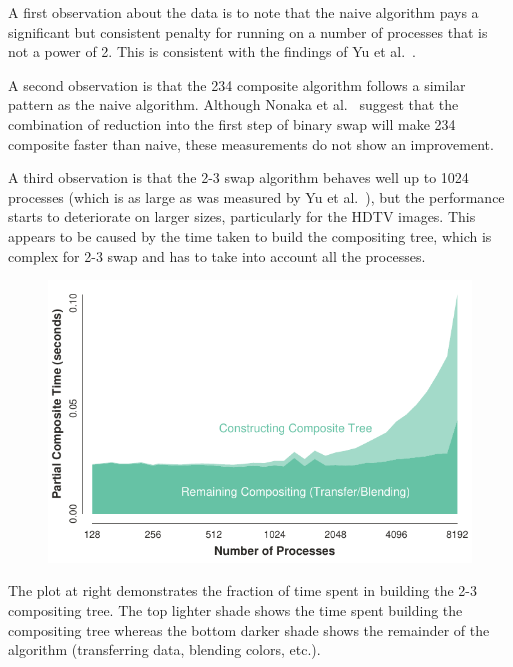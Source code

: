 \documentclass{vgtc}                          %
\newcommand*{\scite}[1]{~\cite{#1}}
\newcommand{\etal}{et al.\xspace}
\newcommand*{\textalgorithm}[1]{\textsf{#1}\xspace}
\newcommand{\ttswap}{\textalgorithm{2-3 swap}}
\newcommand{\naive}{\textalgorithm{naive}}
\newcommand{\ttfcomposite}{\textalgorithm{234 composite}}
\begin{document}
A first observation about the data is to note that the \naive algorithm pays a significant but consistent penalty for running on a number of processes that is not a power of 2.
This is consistent with the findings of Yu et al.\scite{23Swap}.

A second observation is that the \ttfcomposite algorithm follows a similar pattern as the \naive algorithm.
Although Nonaka \etal\scite{Nonaka2015} suggest that the combination of reduction into the first step of binary swap will make \ttfcomposite faster than \naive, these measurements do not show an improvement.

A third observation is that the \ttswap algorithm behaves well up to 1024 processes (which is as large as was measured by Yu et al.\scite{23Swap}), but the performance starts to deteriorate on larger sizes, particularly for the HDTV images.
This appears to be caused by the time taken to build the compositing tree, which is complex for \ttswap and has to take into account all the processes.

\begin{figure}
  \includegraphics[width=\linewidth]{2-3-swap-overhead}
\end{figure}
The plot at right demonstrates the fraction of time spent in building the 2-3 compositing tree.
The top lighter shade shows the time spent building the compositing tree whereas the bottom darker shade shows the remainder of the algorithm (transferring data, blending colors, etc.).
\end{document}
